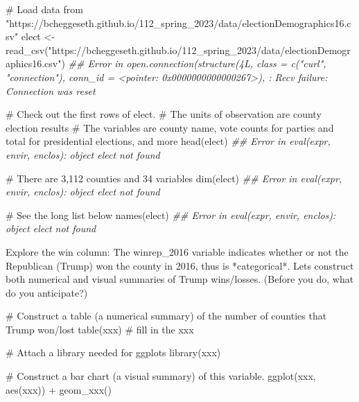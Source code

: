 \documentclass[
  letterpaper,
  DIV=11,
  numbers=noendperiod]{scrreprt}
\newenvironment{Shaded}{\begin{snugshade}}{\end{snugshade}}
\newcommand{\CommentTok}[1]{\textcolor[rgb]{0.37,0.37,0.37}{#1}}
\newcommand{\DocumentationTok}[1]{\textcolor[rgb]{0.37,0.37,0.37}{\textit{#1}}}
\newcommand{\FunctionTok}[1]{\textcolor[rgb]{0.28,0.35,0.67}{#1}}
\newcommand{\NormalTok}[1]{\textcolor[rgb]{0.00,0.23,0.31}{#1}}
\newcommand{\OtherTok}[1]{\textcolor[rgb]{0.00,0.23,0.31}{#1}}
\newcommand{\SpecialCharTok}[1]{\textcolor[rgb]{0.37,0.37,0.37}{#1}}
\newcommand{\StringTok}[1]{\textcolor[rgb]{0.13,0.47,0.30}{#1}}
\begin{document}
\begin{Shaded}
\begin{Highlighting}[]
\CommentTok{\# Load data from "https://bcheggeseth.github.io/112\_spring\_2023/data/electionDemographics16.csv"}
\NormalTok{elect }\OtherTok{\textless{}{-}} \FunctionTok{read\_csv}\NormalTok{(}\StringTok{"https://bcheggeseth.github.io/112\_spring\_2023/data/electionDemographics16.csv"}\NormalTok{)}
\DocumentationTok{\#\# Error in open.connection(structure(4L, class = c("curl", "connection"), conn\_id = \textless{}pointer: 0x0000000000000267\textgreater{}), : Recv failure: Connection was reset}

\CommentTok{\# Check out the first rows of elect.}
\CommentTok{\# The units of observation are county election results}
\CommentTok{\#  The variables are county name, vote counts for parties and total for presidential elections, and more}
\FunctionTok{head}\NormalTok{(elect)}
\DocumentationTok{\#\# Error in eval(expr, envir, enclos): object \textquotesingle{}elect\textquotesingle{} not found}

\CommentTok{\# There are 3,112 counties and 34 variables}
\FunctionTok{dim}\NormalTok{(elect)}
\DocumentationTok{\#\# Error in eval(expr, envir, enclos): object \textquotesingle{}elect\textquotesingle{} not found}

\CommentTok{\# See the long list below}
\FunctionTok{names}\NormalTok{(elect)}
\DocumentationTok{\#\# Error in eval(expr, envir, enclos): object \textquotesingle{}elect\textquotesingle{} not found}
\end{Highlighting}
\end{Shaded}

\hfill\break

\begin{Shaded}
\begin{Highlighting}[]
\NormalTok{Explore the win column:}
\NormalTok{    The \textasciigrave{}winrep\_2016\textasciigrave{} variable indicates whether or not the Republican (Trump) won the county in 2016, thus is *categorical*.  Let\textquotesingle{}s construct both numerical and visual summaries of Trump wins/losses.  (Before you do, what do you anticipate?) }
\end{Highlighting}
\end{Shaded}

\begin{Shaded}
\begin{Highlighting}[]
\CommentTok{\# Construct a table (a numerical summary) of the number of counties that Trump won/lost}
\FunctionTok{table}\NormalTok{(xxx) }\CommentTok{\# fill in the xxx}

\CommentTok{\# Attach a library needed for ggplots}
\FunctionTok{library}\NormalTok{(xxx)}

\CommentTok{\# Construct a bar chart (a visual summary) of this variable.}
\FunctionTok{ggplot}\NormalTok{(xxx, }\FunctionTok{aes}\NormalTok{(xxx)) }\SpecialCharTok{+}
  \FunctionTok{geom\_xxx}\NormalTok{()}
\end{Highlighting}
\end{Shaded}
\end{document}

